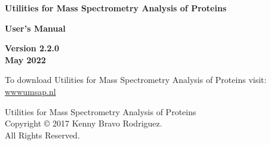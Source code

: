 \clearpage
\thispagestyle{empty}
\begin{center}
{\Huge\textbf{Utilities for Mass Spectrometry Analysis of Proteins}}

\vspace{60pt}

{\huge \textbf{User's Manual}}

\vspace{70pt}

{\Large \textbf{Version \num[parse-numbers=false,detect-weight]{2.2.0} \\ 
\vspace{10pt} May \num[detect-weight]{2022}}}

\vspace{140pt}

To download Utilities for Mass Spectrometry Analysis of Proteins visit: \\
\href{https://www.umsap.nl}{wwwumsap.nl}

\vspace*{\fill}
Utilities for Mass Spectrometry Analysis of Proteins \\
Copyright © \num[detect-weight]{2017} Kenny Bravo Rodriguez. \\All Rights Reserved.

\end{center}

\newpage
\thispagestyle{empty}
 \label{sec:tableofcontent}
\tableofcontents

\newpage
\thispagestyle{empty}
 \label{sec:listoffig}
\listoffigures

\newpage
\thispagestyle{empty}
 \label{sec:listoftables}
\listoftables